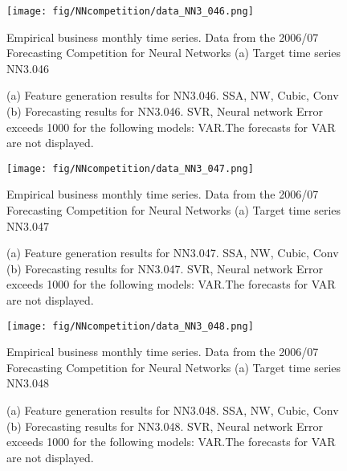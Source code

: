 \documentclass[12pt]{article}
\begin{document}
\begin{figure}
\centering
\texttt{[image: fig/NNcompetition/data\_NN3\_046.png]}
\caption{Empirical business monthly time series. Data from the 2006/07 Forecasting Competition for Neural Networks	(a) Target time series	NN3.046	}
\end{figure}


\begin{figure}
\centering
{}
\caption{(a)	Feature generation results for	NN3.046.	SSA, NW, Cubic, Conv	(b)	Forecasting results for	NN3.046.	SVR, Neural network	Error exceeds 1000 for the following models: VAR.The forecasts for VAR are not displayed.	}
\end{figure}


\begin{figure}
\centering
\texttt{[image: fig/NNcompetition/data\_NN3\_047.png]}
\caption{Empirical business monthly time series. Data from the 2006/07 Forecasting Competition for Neural Networks	(a) Target time series	NN3.047	}
\end{figure}


\begin{figure}
\centering
{}
\caption{(a)	Feature generation results for	NN3.047.	SSA, NW, Cubic, Conv	(b)	Forecasting results for	NN3.047.	SVR, Neural network	Error exceeds 1000 for the following models: VAR.The forecasts for VAR are not displayed.	}
\end{figure}


\begin{figure}
\centering
\texttt{[image: fig/NNcompetition/data\_NN3\_048.png]}
\caption{Empirical business monthly time series. Data from the 2006/07 Forecasting Competition for Neural Networks	(a) Target time series	NN3.048	}
\end{figure}


\begin{figure}
\centering
{}
\caption{(a)	Feature generation results for	NN3.048.	SSA, NW, Cubic, Conv	(b)	Forecasting results for	NN3.048.	SVR, Neural network	Error exceeds 1000 for the following models: VAR.The forecasts for VAR are not displayed.	}
\end{figure}
\end{document}
